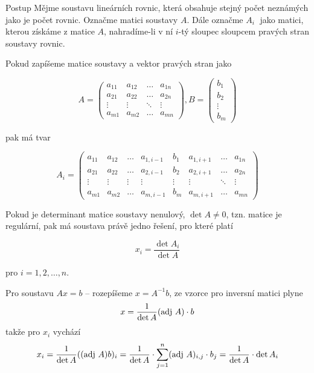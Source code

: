 \begin{obecne}{Postup}
Mějme soustavu lineárních rovnic, která obsahuje stejný počet neznámých jako je počet rovnic. Označme matici soustavy $A$. Dále označme $A_i\;$ jako matici, kterou získáme z matice $A$, nahradíme-li v ní $i$-tý sloupec sloupcem pravých stran soustavy rovnic.

Pokud zapíšeme matice soustavy a vektor pravých stran jako

$$
A =
\left( \begin{array}{cccc}
    a_{11} & a_{12} & \dots  & a_{1n} \\
	a_{21} & a_{22} &  \dots  & a_{2n} \\
	\vdots  &  \vdots  &  \ddots  &  \vdots \\
	a_{m1} & a_{m2} &  \dots  & a_{mn}
\end{array} \right), 
B = \left( \begin{array}{cccc} b_1 \\b_2 \\ \vdots  \\b_m \end{array} \right)
$$

pak má tvar

$$
A_i=
\left( \begin{array}{cccccccc}
	a_{11} & a_{12} & \dots & a_{1,i-1} & b_1 & a_{1,i+1} & \dots  & a_{1n} \\
	a_{21} & a_{22} & \dots & a_{2,i-1} & b_2 & a_{2,i+1} & \dots  & a_{2n} \\
	\vdots & \vdots & \vdots & \vdots & \vdots & \vdots & \ddots & \vdots \\
	a_{m1} & a_{m2} & \dots & a_{m,i-1} & b_m & a_{m,i+1} & \dots & a_{mn}
\end{array} \right)
$$

Pokud je determinant matice soustavy nenulový, $\det A \neq 0$, tzn. matice je regulární, pak má soustava právě jedno řešení, pro které platí

$$x_i = \frac{\det A_i}{\det A}$$

pro $i = 1,2, \dots ,n$.
\end{obecne}

\begin{dukaz}
Pro soustavu $Ax=b$ -- rozepíšeme $x=A^{-1}b$, ze vzorce pro inversní matici plyne
$$x=\frac{1}{\det A}(\mathrm{adj\ } A)\cdot b$$
takže pro $x_i$ vychází 
$$x_i=\frac{1}{\det A}((\mathrm{adj\ } A)b)_i=\frac{1}{\det A}\cdot\sum_{j=1}^n(\mathrm{adj\ } A)_{i,j}\cdot b_j=\frac{1}{\det A}\cdot\det A_i$$
\end{dukaz}

